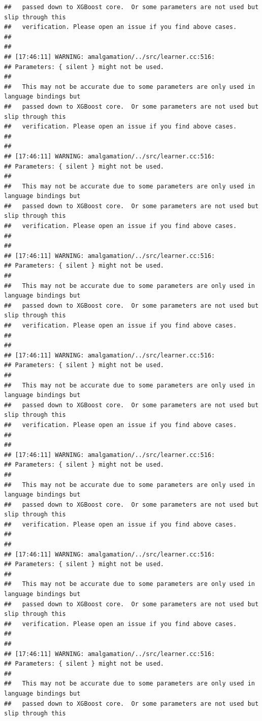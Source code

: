 \documentclass[AMS,STIX2COL]{WileyNJD-v2}\usepackage[]{graphicx}\usepackage[]{color}
\makeatletter
\newenvironment{kframe}{%
 \def\at@end@of@kframe{}%
 \ifinner\ifhmode%
  \def\at@end@of@kframe{\end{minipage}}%
  \begin{minipage}{\columnwidth}%
 \fi\fi%
 \def\FrameCommand##1{\hskip\@totalleftmargin \hskip-\fboxsep
 \colorbox{shadecolor}{##1}\hskip-\fboxsep
     \hskip-\linewidth \hskip-\@totalleftmargin \hskip\columnwidth}%
 \MakeFramed {\advance\hsize-\width
   \@totalleftmargin\z@ \linewidth\hsize
   \@setminipage}}%
 {\par\unskip\endMakeFramed%
 \at@end@of@kframe}
\newenvironment{knitrout}{}{} %
\makeatother
\begin{document}
\begin{knitrout}
\begin{kframe}
\begin{verbatim}
##   passed down to XGBoost core.  Or some parameters are not used but slip through this
##   verification. Please open an issue if you find above cases.
## 
## 
## [17:46:11] WARNING: amalgamation/../src/learner.cc:516: 
## Parameters: { silent } might not be used.
## 
##   This may not be accurate due to some parameters are only used in language bindings but
##   passed down to XGBoost core.  Or some parameters are not used but slip through this
##   verification. Please open an issue if you find above cases.
## 
## 
## [17:46:11] WARNING: amalgamation/../src/learner.cc:516: 
## Parameters: { silent } might not be used.
## 
##   This may not be accurate due to some parameters are only used in language bindings but
##   passed down to XGBoost core.  Or some parameters are not used but slip through this
##   verification. Please open an issue if you find above cases.
## 
## 
## [17:46:11] WARNING: amalgamation/../src/learner.cc:516: 
## Parameters: { silent } might not be used.
## 
##   This may not be accurate due to some parameters are only used in language bindings but
##   passed down to XGBoost core.  Or some parameters are not used but slip through this
##   verification. Please open an issue if you find above cases.
## 
## 
## [17:46:11] WARNING: amalgamation/../src/learner.cc:516: 
## Parameters: { silent } might not be used.
## 
##   This may not be accurate due to some parameters are only used in language bindings but
##   passed down to XGBoost core.  Or some parameters are not used but slip through this
##   verification. Please open an issue if you find above cases.
## 
## 
## [17:46:11] WARNING: amalgamation/../src/learner.cc:516: 
## Parameters: { silent } might not be used.
## 
##   This may not be accurate due to some parameters are only used in language bindings but
##   passed down to XGBoost core.  Or some parameters are not used but slip through this
##   verification. Please open an issue if you find above cases.
## 
## 
## [17:46:11] WARNING: amalgamation/../src/learner.cc:516: 
## Parameters: { silent } might not be used.
## 
##   This may not be accurate due to some parameters are only used in language bindings but
##   passed down to XGBoost core.  Or some parameters are not used but slip through this
##   verification. Please open an issue if you find above cases.
## 
## 
## [17:46:11] WARNING: amalgamation/../src/learner.cc:516: 
## Parameters: { silent } might not be used.
## 
##   This may not be accurate due to some parameters are only used in language bindings but
##   passed down to XGBoost core.  Or some parameters are not used but slip through this

\end{verbatim}
\end{kframe}
\end{knitrout}
\end{document}
